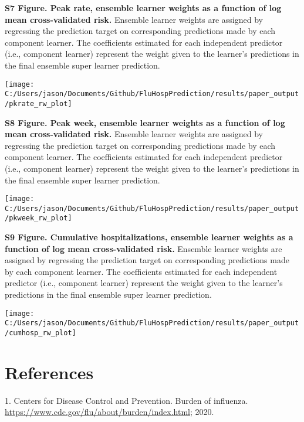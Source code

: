 \documentclass[10pt,letterpaper]{article}
\begin{document}
\newpage

\noindent \textbf{S7 Figure. Peak rate, ensemble learner weights as a
function of log mean cross-validated risk.} Ensemble learner weights are
assigned by regressing the prediction target on corresponding
predictions made by each component learner. The coefficients estimated
for each independent predictor (i.e., component learner) represent the
weight given to the learner's predictions in the final ensemble super
learner prediction.

\texttt{[image: C:/Users/jason/Documents/Github/FluHospPrediction/results/paper\_output/pkrate\_rw\_plot]}

\newpage

\noindent \textbf{S8 Figure. Peak week, ensemble learner weights as a
function of log mean cross-validated risk.} Ensemble learner weights are
assigned by regressing the prediction target on corresponding
predictions made by each component learner. The coefficients estimated
for each independent predictor (i.e., component learner) represent the
weight given to the learner's predictions in the final ensemble super
learner prediction.

\texttt{[image: C:/Users/jason/Documents/Github/FluHospPrediction/results/paper\_output/pkweek\_rw\_plot]}

\newpage

\noindent \textbf{S9 Figure. Cumulative hospitalizations, ensemble
learner weights as a function of log mean cross-validated risk.}
Ensemble learner weights are assigned by regressing the prediction
target on corresponding predictions made by each component learner. The
coefficients estimated for each independent predictor (i.e., component
learner) represent the weight given to the learner's predictions in the
final ensemble super learner prediction.

\texttt{[image: C:/Users/jason/Documents/Github/FluHospPrediction/results/paper\_output/cumhosp\_rw\_plot]}

\newpage

\hypertarget{references}{%
\section{References}\label{references}}



\hypertarget{refs}{}
\leavevmode\hypertarget{ref-Centers_for_Disease_Control_and_Prevention2020-uc}{}%
1. Centers for Disease Control and Prevention. Burden of influenza.
\url{https://www.cdc.gov/flu/about/burden/index.html}; 2020.
\end{document}
